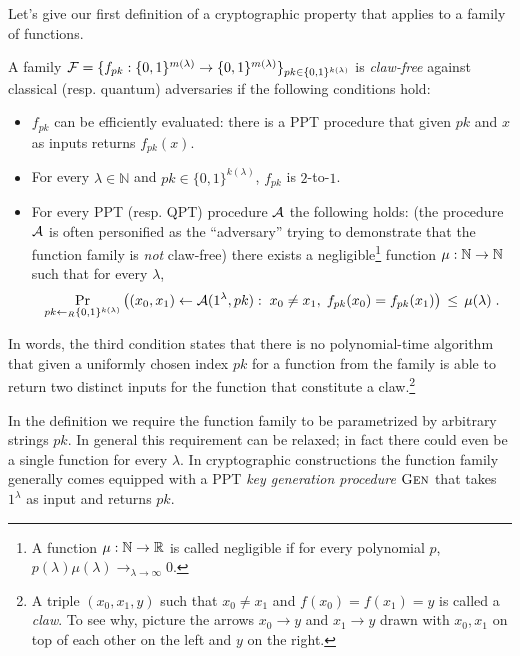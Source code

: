 Let's give our first definition of a cryptographic property that applies to a family of functions. 

\begin{definition}
A family $\mathcal{F} = \{f_{pk}: \{0,1\}^{m(\lambda)} \to \{0,1\}^{m(\lambda)}\}_{pk\in\{0,1\}^{k(\lambda)}}$ is \emph{claw-free} against classical (resp. quantum) adversaries if 
the following conditions hold:
\begin{itemize}
\item $f_{pk}$ can be efficiently evaluated: there is a PPT procedure that given $pk$ and $x$ as inputs returns $f_{pk}(x)$.
\item For every $\lambda\in \mathbb{N}$ and  $pk\in\{0,1\}^{k(\lambda)}$, $f_{pk}$ is $2$-to-$1$.
\item For every PPT (resp. QPT) procedure $\mathcal{A}$ the following holds: (the procedure $\mathcal{A}$ is often personified as the ``adversary'' trying to demonstrate that the function family is \emph{not} claw-free) there exists a negligible\footnote{A function $\mu:\mathbb{N}\to\mathbb{R}$ is called {negligible} if for every polynomial $p$, $p(\lambda)\mu(\lambda)\to_{\lambda\to\infty} 0$.} function $\mu:\mathbb{N}\to\mathbb{N}$ such that for every $\lambda$, 
\[ \Pr_{pk\leftarrow_R \{0,1\}^{k(\lambda)}}\big( (x_0,x_1)\leftarrow \mathcal{A}(1^\lambda,pk):\; x_0\neq x_1,\; f_{pk}(x_0)= f_{pk}(x_1)\big) \,\leq\, \mu(\lambda)\;.\]
\end{itemize}
\end{definition}

In words, the third condition states that there is no polynomial-time algorithm that given a uniformly chosen index $pk$ for a function from the family is able to return two distinct inputs for the function that constitute a claw.\footnote{A triple $(x_0,x_1,y)$ such that $x_0\neq x_1$ and $f(x_0)=f(x_1)=y$ is called a \emph{claw}. To see why, picture the arrows $x_0\rightarrow y$ and $x_1\rightarrow y$ drawn with $x_0,x_1$ on top of each other on the left and $y$ on the right.}

\begin{remark}
In the definition we require the function family to be parametrized by arbitrary strings $pk$. In general this requirement can be relaxed; in fact there could even be a single function for every $\lambda$. In cryptographic constructions the function family generally comes equipped with a PPT \emph{key generation procedure} $\textsc{Gen}$ that takes $1^\lambda$ as input and returns $pk$.
\end{remark}

